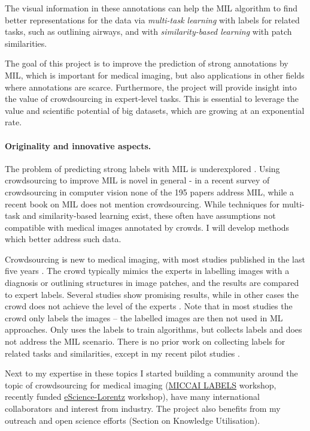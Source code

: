 \documentclass[serif, twocolumn, numeric, rga]{jote-article}
\begin{document}
The visual information in these annotations can help the MIL algorithm to find better representations for the data via \emph{multi-task learning} \cite{Caruana1998a} with labels for related tasks, such as outlining airways, and with \emph{similarity-based learning} \cite{Weinberger2009, vanderMaaten2012a} with patch similarities.

The goal of this project is to improve the prediction of strong annotations by MIL, which is important for medical imaging, but also applications in other fields where annotations are scarce. Furthermore, the project will provide insight into the value of crowdsourcing in expert-level tasks. This is essential to leverage the value and scientific potential of big datasets, which are growing at an exponential rate.
\paragraph{Originality and innovative aspects.}


The problem of predicting strong labels with MIL is underexplored \cite{Quellec2017, Carbonneau2016}. Using crowdsourcing to improve MIL is novel in general - in a recent survey of crowdsourcing in computer vision \cite{Kovashka2016} none of the 195 papers address MIL, while a recent book on MIL \cite{Herrera2016a} does not mention crowdsourcing. While techniques for multi-task and similarity-based learning exist, these often have assumptions not compatible with medical images annotated by crowds. I will develop methods which better address such data.

Crowdsourcing is new to medical imaging, with most studies published in the last five years \cite{Cheplygina2016a, Maier-Hein2014, Maier-Hein2014b, Mitry2015a, Nguyen2012, Albarqouni2016}. The crowd typically mimics the experts in labelling images with a diagnosis or outlining structures in image patches, and the results are compared to expert labels. Several studies show promising results, while in other cases the crowd does not achieve the level of the experts \cite{Mitry2015a, Albarqouni2016}. Note that in most studies the crowd only labels the images -- the labelled images are then not used in ML approaches. Only \cite{Albarqouni2016} uses the labels to train algorithms, but collects labels and does not address the MIL scenario.
There is no prior work on collecting labels for related tasks and similarities, except in my recent pilot studies \cite{Cheplygina2016a, Orting2017}.

Next to my expertise in these topics I started building a community around the topic of crowdsourcing for medical imaging (\href{http://www.miccailabels.org}{MICCAI LABELS} workshop, recently funded \href{https://www.esciencecenter.nl/news/crowdsourcing-for-medical-image-analysis-wins-lorentz-escience-workshop-com}{eScience-Lorentz}
workshop), have many international collaborators and interest from industry. The project also benefits from my outreach and open science efforts (Section on Knowledge Utilisation).
\end{document}
